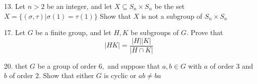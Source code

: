 \begin{mdframed}[style=darkAnswer,frametitle={Joe Starr}]
\end{mdframed}
\newpage
\begin{mdframed}[style=darkQuesion]
  13. Let $n>2$ be an integer, and let $X \subseteq S_{n} \times S_{n}$ be the set $X=\{(\sigma, \tau) | \sigma(1)=\tau(1)\}$ Show that $X$ is not a subgroup of $S_{n} \times S_{n}$
\end{mdframed}
\begin{mdframed}[style=darkAnswer,frametitle={Joe Starr}]
\end{mdframed}
\newpage
\begin{mdframed}[style=darkQuesion]
  17. Let $G$ be a finite group, and let $H, K$ be subgroups of $G .$ Prove that
$$
|H K|=\frac{|H||K|}{|H \cap K|}
$$ 
\end{mdframed}
\begin{mdframed}[style=darkAnswer,frametitle={Joe Starr}]
\end{mdframed}
\newpage
\begin{mdframed}[style=darkQuesion]
20. thet $G$ be a group of order $6,$ and suppose that $a, b \in G$ with $a$ of order 3 and $b$ of order $2 .$ Show that either $G$ is cyclic or $a b \neq b a$
\end{mdframed}
\begin{mdframed}[style=darkAnswer,frametitle={Joe Starr}]
\end{mdframed}
